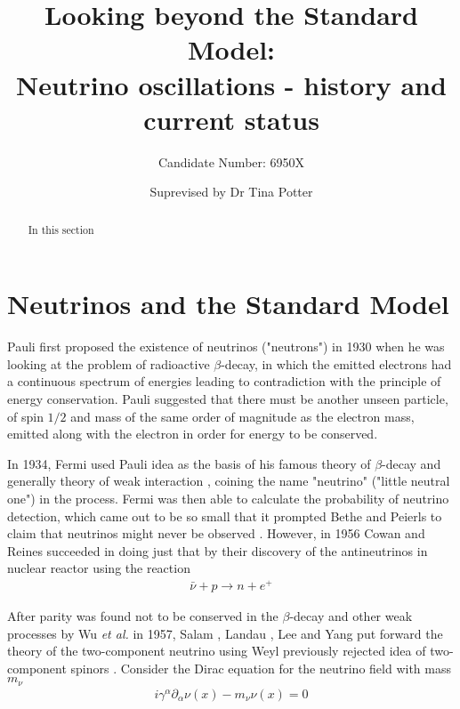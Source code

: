 \documentclass[english]{article}
\begin{document}
\title{Looking beyond the Standard Model: \\Neutrino oscillations - history and current status}
\author{Candidate Number: 6950X}
\date{Suprevised by Dr Tina Potter}
\maketitle

\thispagestyle{fancy}

\begin{abstract}
In this section
\end{abstract}

\section{Neutrinos and the Standard Model}
	Pauli first proposed the existence of neutrinos ("neutrons") in 1930 \cite{pauliletter1930} when he was looking at the problem of radioactive $\beta$-decay, in which the emitted electrons had a continuous spectrum of energies leading to contradiction with the principle of energy conservation. Pauli suggested that there must be another unseen particle, of spin $1/2$ and mass of the same order of magnitude as the electron mass, emitted along with the electron in order for energy to be conserved.
    
    In 1934, Fermi used Pauli idea as the basis of his famous theory of $\beta$-decay and generally theory of weak interaction \cite{fermi1934}, coining the name "neutrino" ("little neutral one") in the process. Fermi was then able to calculate the probability of neutrino detection, which came out to be so small that it prompted Bethe and Peierls to claim that neutrinos might never be observed \cite{bethepeierls1934}. However, in 1956 Cowan and Reines succeeded in doing just that \cite{cowanreines1956} by their discovery of the antineutrinos in nuclear reactor using the reaction
    \begin{gather}
    	\bar{\nu}+p \rightarrow n+e^{+}
    \end{gather}
    
    After parity was found not to be conserved in the $\beta$-decay and other weak processes \cite{wu1957} by Wu \textit{et al.} in 1957, Salam \cite{salam1956}, Landau \cite{landau1957}, Lee and Yang \cite{leeyang1957} put forward the theory of the two-component neutrino using Weyl previously rejected idea of two-component spinors \cite{weyl1929}. Consider the Dirac equation for the neutrino field with mass $m_{\nu}$
    \begin{gather}
    	i\gamma^{\alpha} \partial_{\alpha} \nu (x) - m_{\nu} \nu (x) = 0
    \end{gather}
    
\end{document}
